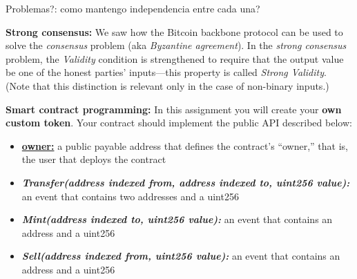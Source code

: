 \documentclass[12pt,addpoints,answers]{exam}
\begin{document}
\begin{questions}
\begin{parts}
\begin{solution}
        Problemas?: como mantengo independencia entre cada una?
    \end{solution}
    
    \end{parts}
    
\newpage

\question \textbf{Strong consensus:} We saw how the Bitcoin backbone protocol can be used to solve the {\em consensus} problem (aka {\em Byzantine agreement}). In the {\em strong consensus} problem, the {\em Validity} condition is strengthened to require that the output value be one of the honest parties' inputs---this property is called {\em Strong Validity}. (Note that this distinction is relevant only in the case of non-binary inputs.)


\newpage

\question \textbf{Smart contract programming:}  In this assignment you will create your {\bf own custom token}. Your contract should implement the public API described below:

\begin{itemize}
\item \underline{\textbf{owner:}} a public payable address that defines the contract’s ``owner,'' that is, the user that deploys the contract
\item \textbf{\textit{Transfer(address indexed from, address indexed to, uint256 value):}} an event that contains two addresses and a uint256
\item \textbf{\textit{Mint(address indexed to, uint256 value):}} an event that contains an address and a uint256
\item \textbf{\textit{Sell(address indexed from, uint256 value):}} an event that contains an address and a uint256


\end{itemize}
\end{questions}
\end{document}
